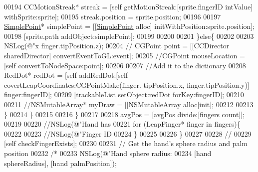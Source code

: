 \begin{DoxyCode}
{{{00194                         CCMotionStreak* streak = [\textcolor{keyword}{self} getMotionStreak:[sprite.fingerID intValue] 
      withSprite:sprite];
00195                         streak.position = sprite.position;
00196                         
00197                         \hyperlink{interface_simple_point}{SimplePoint}* simplePoint = [[\hyperlink{interface_simple_point}{SimplePoint} alloc] 
      initWithPosition:sprite.position];
00198                         [sprite.path addObject:simplePoint];
00199                         
00200                         
00201                     \}\textcolor{keywordflow}{else}\{
00202                         
00203                         NSLog(\textcolor{stringliteral}{@"x %
      finger.tipPosition.z);
00204                         \textcolor{comment}{// CGPoint point = [[CCDirector sharedDirector] convertEventToGL:event];}
00205                         \textcolor{comment}{//CGPoint mouseLocation = [self convertToNodeSpace:point];}
00206                         
00207                         \textcolor{comment}{//Add it to the dictionary}
00208                         RedDot* redDot = [\textcolor{keyword}{self} addRedDot:[\textcolor{keyword}{self} covertLeapCoordinates:CGPointMake(finger.
      tipPosition.x, finger.tipPosition.y)] finger:fingerID];
00209                         [trackableList setObject:redDot forKey:fingerID];
00210                         
00211                         \textcolor{comment}{//NSMutableArray* myDraw = [[NSMutableArray alloc]init];}
00212                         
00213                     \}
00214                 \}
00215 
00216             \}
00217             
00218             avgPos = [avgPos divide:[fingers count]];
00219             
00220             \textcolor{comment}{//NSLog(@"Hand has %
00221             \textcolor{keywordflow}{for} (LeapFinger* finger in fingers)\{
00222                 
00223                 \textcolor{comment}{//NSLog(@"Finger ID %
00224             \}
00225             
00226         \}
00227         
00228         \textcolor{comment}{//}
00229         [\textcolor{keyword}{self} checkFingerExists];
00230         
00231         \textcolor{comment}{// Get the hand's sphere radius and palm position}
00232         \textcolor{comment}{/*}
00233 \textcolor{comment}{         NSLog(@"Hand sphere radius: %
00234 \textcolor{comment}{         [hand sphereRadius], [hand palmPosition]);}
}}}}}}}
\end{DoxyCode}
